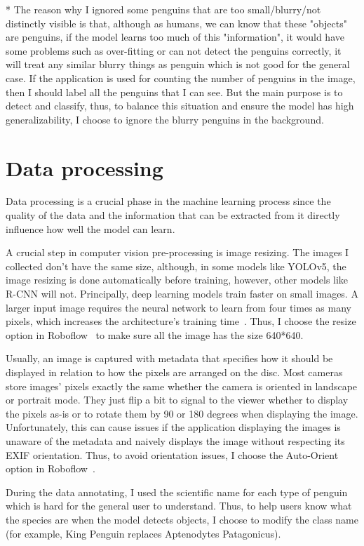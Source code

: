 \documentclass[runningheads]{llncs}
\begin{document}
* The reason why I ignored some penguins that are too small/blurry/not distinctly visible is that, although as humans, we can know that these "objects" are penguins, if the model learns too much of this "information", it would have some problems such as over-fitting or can not detect the penguins correctly, it will treat any similar blurry things as penguin which is not good for the general case. If the application is used for counting the number of penguins in the image, then I should label all the penguins that I can see. But the main purpose is to detect and classify, thus, to balance this situation and ensure the model has high generalizability, I choose to ignore the blurry penguins in the background.

\section{Data processing}
Data processing is a crucial phase in the machine learning process since the quality of the data and the information that can be extracted from it directly influence how well the model can learn. 

A crucial step in computer vision pre-processing is image resizing. The images I collected don't have the same size, although, in some models like YOLOv5, the image resizing is done automatically before training, however, other models like R-CNN will not. Principally, deep learning models train faster on small images. A larger input image requires the neural network to learn from four times as many pixels, which increases the architecture's training time~\cite{resize}. Thus, I choose the resize option in Roboflow~\cite{ref_roboflow} to make sure all the image has the size 640*640.

Usually, an image is captured with metadata that specifies how it should be displayed in relation to how the pixels are arranged on the disc. Most cameras store images' pixels exactly the same whether the camera is oriented in landscape or portrait mode. They just flip a bit to signal to the viewer whether to display the pixels as-is or to rotate them by 90 or 180 degrees when displaying the image. Unfortunately, this can cause issues if the application displaying the images is unaware of the metadata and naively displays the image without respecting its EXIF orientation. Thus, to avoid orientation issues, I choose the Auto-Orient option in Roboflow~\cite{ref_roboflow}.

During the data annotating, I used the scientific name for each type of penguin which is hard for the general user to understand. Thus, to help users know what the species are when the model detects objects, I choose to modify the class name (for example, King Penguin replaces Aptenodytes Patagonicus).
\end{document}
